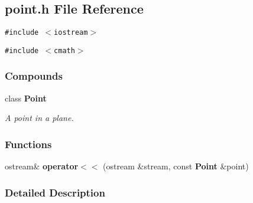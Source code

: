 \subsection{point.h File Reference}
\label{point_h}
{\tt \#include $<$iostream$>$}\par
{\tt \#include $<$cmath$>$}\par
\subsubsection*{Compounds}
\begin{CompactItemize}
\item 
class {\bf Point}
\begin{CompactList}\small\item\em A point in a plane.\item\end{CompactList}\end{CompactItemize}
\subsubsection*{Functions}
\begin{CompactItemize}
\item 
{}
ostream\& {\bf operator$<$$<$} (ostream \&stream, const {\bf Point} \&point)\label{point_h_a0}

\end{CompactItemize}


\subsubsection{Detailed Description}



